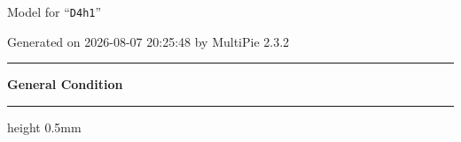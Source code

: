 \documentclass[fleqn,10pt,landscape]{jsarticle}
\begin{document}
\setcounter{MaxMatrixCols}{32}

\renewcommand{\tablename}{Table~}
\renewcommand{\figurename}{Figure~}
\setlength{\baselineskip}{16pt}
\setlength{\parindent}{0pt}
\setlength{\mathindent}{0pt}
\footnotesize
\begin{center}
\LARGE
Model for ``\texttt{D4h1}''
\end{center}
\begin{flushright}
Generated on 2026-08-07 20:25:48 by MultiPie 2.3.2
\end{flushright}
\setlength{\baselineskip}{16pt}
\footnotesize
\vspace{5mm}
\noindent \rule[0.5mm]{5mm}{0.5mm}\hspace{3mm}\textbf{General Condition}\hspace{3mm}\leaders\hrule height 0.5mm\hfill\kern0pt
\vspace{3mm}
\end{document}
